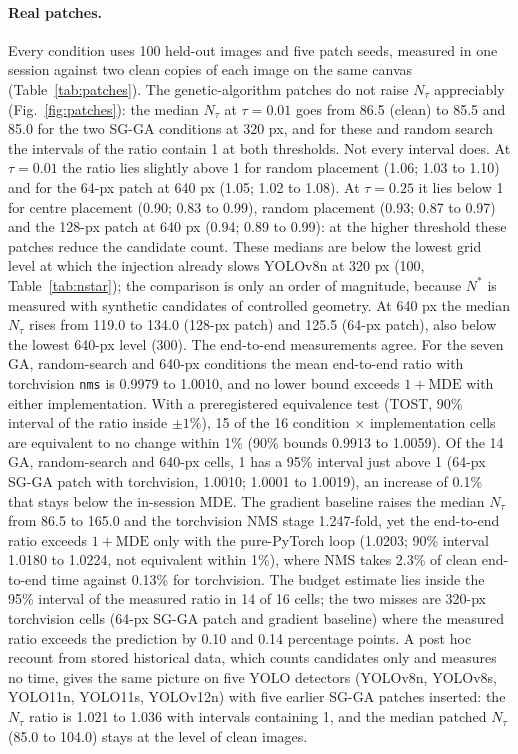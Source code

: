 \documentclass[a4paper,fleqn]{cas-dc}
\newcommand{\Ntau}{N_{\tau}}
\begin{document}
\paragraph{Real patches.}
Every condition uses 100 held-out images and five patch seeds, measured in one session against two clean copies of each image on the same canvas (Table~\ref{tab:patches}). The genetic-algorithm patches do not raise $\Ntau$ appreciably (Fig.~\ref{fig:patches}): the median $\Ntau$ at $\tau=0.01$ goes from 86.5 (clean) to 85.5 and 85.0 for the two SG-GA conditions at 320 px, and for these and random search the intervals of the ratio contain 1 at both thresholds. Not every interval does. At $\tau=0.01$ the ratio lies slightly above 1 for random placement (1.06; 1.03 to 1.10) and for the 64-px patch at 640 px (1.05; 1.02 to 1.08). At $\tau=0.25$ it lies below 1 for centre placement (0.90; 0.83 to 0.99), random placement (0.93; 0.87 to 0.97) and the 128-px patch at 640 px (0.94; 0.89 to 0.99): at the higher threshold these patches reduce the candidate count. These medians are below the lowest grid level at which the injection already slows YOLOv8n at 320 px (100, Table~\ref{tab:nstar}); the comparison is only an order of magnitude, because $N^{*}$ is measured with synthetic candidates of controlled geometry. At 640 px the median $\Ntau$ rises from 119.0 to 134.0 (128-px patch) and 125.5 (64-px patch), also below the lowest 640-px level (300). The end-to-end measurements agree. For the seven GA, random-search and 640-px conditions the mean end-to-end ratio with torchvision \texttt{nms} is 0.9979 to 1.0010, and no lower bound exceeds $1+\mathrm{MDE}$ with either implementation. With a preregistered equivalence test (TOST, 90\% interval of the ratio inside $\pm1\%$), 15 of the 16 condition $\times$ implementation cells are equivalent to no change within 1\% (90\% bounds 0.9913 to 1.0059). Of the 14 GA, random-search and 640-px cells, 1 has a 95\% interval just above 1 (64-px SG-GA patch with torchvision, 1.0010; 1.0001 to 1.0019), an increase of 0.1\% that stays below the in-session MDE. The gradient baseline raises the median $\Ntau$ from 86.5 to 165.0 and the torchvision NMS stage 1.247-fold, yet the end-to-end ratio exceeds $1+\mathrm{MDE}$ only with the pure-PyTorch loop (1.0203; 90\% interval 1.0180 to 1.0224, not equivalent within 1\%), where NMS takes 2.3\% of clean end-to-end time against 0.13\% for torchvision. The budget estimate lies inside the 95\% interval of the measured ratio in 14 of 16 cells; the two misses are 320-px torchvision cells (64-px SG-GA patch and gradient baseline) where the measured ratio exceeds the prediction by 0.10 and 0.14 percentage points. A post hoc recount from stored historical data, which counts candidates only and measures no time, gives the same picture on five YOLO detectors (YOLOv8n, YOLOv8s, YOLO11n, YOLO11s, YOLOv12n) with five earlier SG-GA patches inserted: the $\Ntau$ ratio is 1.021 to 1.036 with intervals containing 1, and the median patched $\Ntau$ (85.0 to 104.0) stays at the level of clean images.
\end{document}
